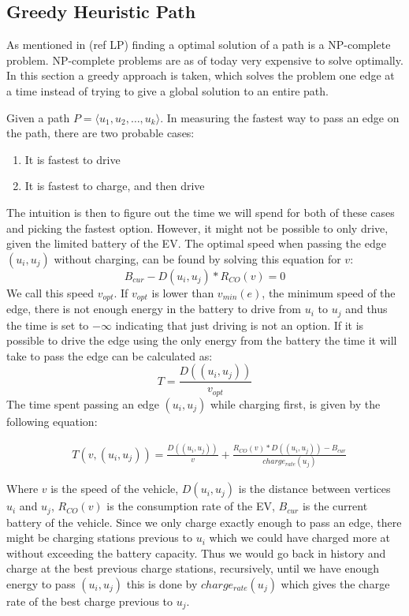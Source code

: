 \subsection{Greedy Heuristic Path}\label{sec:greedy}
As mentioned in (ref LP) finding a optimal solution of a path is a NP-complete problem. NP-complete problems are as of today very expensive to solve optimally. In this section a greedy approach is taken, which solves the problem one edge at a time instead of trying to give a global solution to an entire path.  

Given a path $P = \langle u_1,u_2,\dots,u_k \rangle$. In measuring the fastest way to pass an edge on the path, there are two probable cases:
\begin{enumerate}
	\item It is fastest to drive
	\item It is fastest to charge, and then drive
\end{enumerate}

The intuition is then to figure out the time we will spend for both of these cases and picking the fastest option. However, it might not be possible to only drive, given the limited battery of the EV. The optimal speed when passing the edge $(u_i, u_j)$ without charging, can be found by solving this equation for $v$:
\[B_{cur} - D(u_i, u_j) * R_{CO}(v) = 0\] 
We call this speed $v_{opt}$. If $v_{opt}$ is lower than $v_{min}(e)$, the minimum speed of the edge, there is not enough energy in the battery to drive from $u_i$ to $u_j$ and thus the time is set to $-\infty$ indicating that just driving is not an option. If it is possible to drive the edge using the only energy from the battery the time it will take to pass the edge can be calculated as:
 \[T = \frac{D((u_i, u_j))}{v_{opt}} \] 
The time spent passing an edge $(u_i, u_j)$ while charging first, is given by the following equation:

\begin{equation*}
\begin{aligned}
 & T(v,(u_i, u_j)) = \frac{D((u_i, u_j))}{v} + \frac{R_{CO}(v) * D((u_i, u_j)) - B_{cur}}{charge_{rate}(u_j)}
\end{aligned}
\end{equation*}\label{eq:drivingAndCharging}

Where $v$ is the speed of the vehicle, $D(u_i, u_j)$ is the distance between vertices $u_i$ and $u_j$, $R_{CO}(v)$ is the consumption rate of the EV, $B_{cur}$ is the current battery of the vehicle. Since we only charge exactly enough to pass an edge, there might be charging stations previous to $u_i$ which we could have charged more at without exceeding the battery capacity. Thus we would go back in history and charge at the best previous charge stations, recursively, until we have enough energy to pass $(u_i, u_j)$ this is done by $charge_{rate}(u_j)$ which gives the charge rate of the best charge previous to $u_j$.

